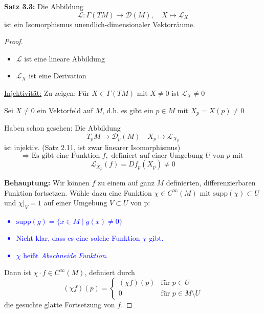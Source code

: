 \documentclass[fleqn, 12pt, letterpaper]{article}
\begin{document}
\noindent
\textbf{Satz 3.3:}
Die Abbildung
\[
\mathcal{L} \colon \Gamma(TM) \longrightarrow \mathcal{D}(M), \quad X \mapsto \mathcal{L}_X
\]
ist ein Isomorphismus unendlich-dimensionaler Vektorräume.
\begin{proof}
\quad
\begin{itemize}
  \item \( \mathcal{L} \) ist eine lineare Abbildung \quad \checkmark
  \item \( \mathcal{L}_X \) ist eine Derivation \quad \checkmark
\end{itemize}

\medskip

\underline{Injektivität:} 
Zu zeigen: Für \( X \in \Gamma(TM) \) mit \( X \neq 0 \) ist \( \mathcal{L}_X \neq 0 \)

\medskip

Sei \( X \neq 0 \) ein Vektorfeld auf \( M \), d.h. es gibt ein \( p \in M \) mit \( X_p = X(p) \neq 0 \)

\medskip

Haben schon gesehen: Die Abbildung
\[
T_p M \longrightarrow \mathcal{D}_p(M) \quad X_p \mapsto \mathcal{L}_{X_p}
\]
ist injektiv. (Satz 2.11, ist zwar linearer Isomorphismus)
\[
\Rightarrow \text{Es gibt eine Funktion } f, \text{ definiert auf einer Umgebung } U \text{ von } p \text{ mit }
\]
\[\mathcal{L}_{X_p}(f) = Df_p(X_p) \neq 0\]

\textbf{Behauptung:} Wir können \( f \) zu einem auf ganz \( M \) definierten, differenzierbaren Funktion fortsetzen. Wähle dazu eine Funktion \( \chi \in C^\infty(M) \) mit $\mathrm{supp}(\chi)\subset U$ und $\chi|_V=1$ auf einer Umgebung $V\subset U$ von p:
\textcolor{blue}{
\begin{itemize}
  \item \(\text{supp}(g) = \{ x \in M \mid g(x) \neq 0 \}\)
  \item Nicht klar, dass es eine solche Funktion \( \chi \) gibt.
  \item \( \chi \) heißt \emph{Abschneide Funktion}.
\end{itemize}
}



Dann ist \( \chi \cdot f \in C^\infty(M) \), definiert durch
\[
(\chi f)(p) = 
\begin{cases}
(\chi f)(p) & \text{für } p \in U \\
0 & \text{für } p \in M \setminus U
\end{cases}
\]
die gesuchte glatte Fortsetzung von \( f \).


\end{proof}
\end{document}
